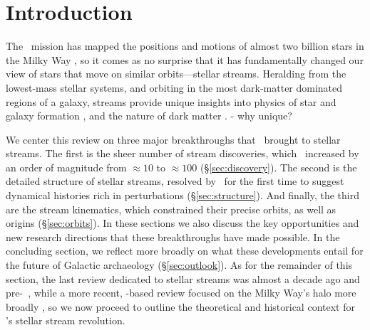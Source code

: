 \documentclass[final,5p,times,twocolumn,authoryear]{elsarticle}
\begin{document}

\section{Introduction}
\label{sec:intro}

The \gaia\ mission has mapped the positions and motions of almost two billion stars in the Milky Way \citep{gaiamission:2016, gaiadr1, gaiadr2, gaiaedr3, gaiadr3}, so it comes as no surprise that it has fundamentally changed our view of stars that move on similar orbits---stellar streams.
Heralding from the lowest-mass stellar systems, and orbiting in the most dark-matter dominated regions of a galaxy, streams provide unique insights into physics of star and galaxy formation \citep{smith:2016, ferguson:2016, carlin:2016}, and the nature of dark matter \citep{johnston:2016a, johnston:2016b}.
- why unique?


We center this review on three major breakthroughs that \gaia\ brought to stellar streams.
The first is the sheer number of stream discoveries, which \gaia\ increased by an order of magnitude from $\approx10$ to $\approx100$ (\S\ref{sec:discovery}).
The second is the detailed structure of stellar streams, resolved by \gaia\ for the first time to suggest dynamical histories rich in perturbations (\S\ref{sec:structure}).
And finally, the third are the stream kinematics, which constrained their precise orbits, as well as origins (\S\ref{sec:orbits}).
In these sections we also discuss the key opportunities and new research directions that these breakthroughs have made possible.
In the concluding section, we reflect more broadly on what these developments entail for the future of Galactic archaeology (\S\ref{sec:outlook}).
As for the remainder of this section, the last review dedicated to stellar streams was almost a decade ago and pre-\gaia\ \citep{newberg:2016}, while a more recent, \gaia-based review focused on the Milky Way's halo more broadly \citep{helmi:2020}, so we now proceed to outline the theoretical and historical context for \gaia's stellar stream revolution.
\end{document}
